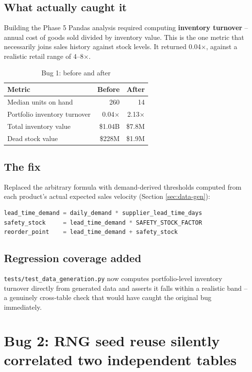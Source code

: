 \documentclass[11pt,a4paper]{report}
\begin{document}
\subsection*{What actually caught it}
Building the Phase 5 Pandas analysis required computing \textbf{inventory
turnover} -- annual cost of goods sold divided by inventory value. This is
the one metric that necessarily joins sales history against stock levels.
It returned 0.04$\times$, against a realistic retail range of 4--8$\times$.

\begin{table}[H]
\centering
\caption{Bug 1: before and after}
\begin{tabular}{lrr}
\toprule
\textbf{Metric} & \textbf{Before} & \textbf{After} \\
\midrule
Median units on hand & 260 & 14 \\
Portfolio inventory turnover & 0.04$\times$ & 2.13$\times$ \\
Total inventory value & \$1.04B & \$7.8M \\
Dead stock value & \$228M & \$1.9M \\
\bottomrule
\end{tabular}
\end{table}

\subsection*{The fix}
Replaced the arbitrary formula with demand-derived thresholds computed
from each product's actual expected sales velocity (Section
\ref{sec:data-gen}):
\begin{lstlisting}[language=Python]
lead_time_demand = daily_demand * supplier_lead_time_days
safety_stock     = lead_time_demand * SAFETY_STOCK_FACTOR
reorder_point    = lead_time_demand + safety_stock
\end{lstlisting}

\subsection*{Regression coverage added}
\texttt{tests/test\_data\_generation.py} now computes portfolio-level
inventory turnover directly from generated data and asserts it falls
within a realistic band -- a genuinely cross-table check that would have
caught the original bug immediately.

\section{Bug 2: RNG seed reuse silently correlated two independent tables}
\end{document}
